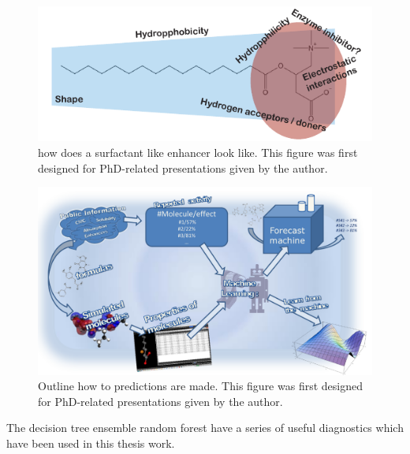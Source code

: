 \begin{figure}[ht]
\label{devel_fassif}
\includegraphics{graphics/typeOfSurfactant.pdf}
\caption{how does a surfactant like enhancer look like. This figure was first designed for PhD-related presentations given by the author.}
\end{figure}

\begin{figure}[ht]
\label{devel_fassif}
\includegraphics[width=\textwidth, height=\textheight, keepaspectratio]{graphics/predictPotencySummary.pdf}
\caption{Outline how to predictions are made. This figure was first designed for PhD-related presentations given by the author.}
\end{figure}

The decision tree ensemble random forest have a series of useful diagnostics which have been used in this thesis work.

\newpage


